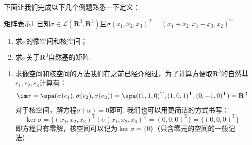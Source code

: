 下面让我们完成以下几个例题熟悉一下定义：
\begin{example}{}{矩阵表示1}
    已知$\sigma \in \mathcal{L}(\mathbf{R}^3,\mathbf{R}^3)$且$\sigma(x_1,x_2,x_3)^{\mathrm{T}}=(x_1+x_2,x_1-x_3, x_2)^{\mathrm{T}}$
    \begin{enumerate}
        \item 求$\sigma$的像空间和核空间；

        \item 求$\sigma$关于$\mathbf{R}^3$自然基的矩阵.
    \end{enumerate}
\end{example}

\begin{solution}
    \begin{enumerate}
        \item 求像空间和核空间的方法我们在之前已经介绍过，为了计算方便取$\mathbf{R}^3$的自然基$e_1,e_2,e_3$计算有：
              \[
                \im\sigma
                =\spa(\sigma(e_1),\sigma(e_2),\sigma(e_3))
                =\spa(
                        (1,1,0)^{\mathrm{T}},
                        (1,0,1)^{\mathrm{T}},
                        (0,-1,0)^{\mathrm{T}}
                    )
                =\mathbf{R}^3
              \]
              对于核空间，解方程$\sigma(\alpha)=0$即可. 我们也可以用更简洁的方式书写：
              \[
                \ker\sigma
                =\{
                    (x_1,x_2,x_3)^{\mathrm{T}} \mid
                    \sigma(x_1,x_2,x_3)^{\mathrm{T}}
                    =(0,0,0)^{\mathrm{T}}
                \}
                =\{(0,0,0)^{\mathrm{T}}\}
              \]
              即方程只有零解，核空间可以记为$\ker\sigma=\{0\}$（只含零元的空间的一般记法）.


\end{enumerate}
\end{solution}
